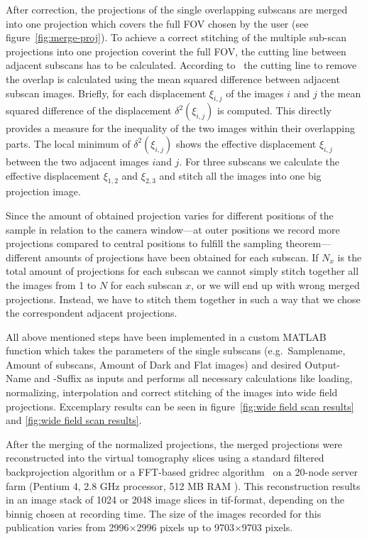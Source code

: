 After correction, the projections of the single overlapping subscans are merged into one projection which covers the full FOV chosen by the user (see figure~\ref{fig:merge-proj}). To achieve a correct stitching of the multiple sub-scan projections into one projection coverint the full FOV, the cutting line between adjacent subscans has to be calculated. According to~\citet{Hintermueller2009} the cutting line to remove the overlap is calculated using the mean squared difference between adjacent subscan images. Briefly, for each displacement $\xi_{i,j}$ of the images $i$ and $j$ the mean squared difference of the displacement $\delta^2(\xi_{i,j})$ is computed. This directly provides a measure for the inequality of the two images within their overlapping parts. The local minimum of $\delta^2(\xi_{i,j})$ shows the effective displacement $\xi_{i,j}$ between the two adjacent images $i$and $j$. For three subscans we calculate the effective displacement $\xi_{1,2}$ and $\xi_{2,3}$ and stitch all the images into one big projection image.

Since the amount of obtained projection varies for different positions of the sample in relation to the camera window---at outer positions we record more projections compared to central positions to fulfill the sampling theorem---different amounts of projections have been obtained for each subscan. If $N_x$ is the total amount of projections for each subscan we cannot simply stitch together all the images from 1 to $N$ for each subscan $x$, or we will end up with wrong merged projections. Instead, we have to stitch them together in such a way that we chose the correspondent adjacent projections. 

All above mentioned steps have been implemented in a custom MATLAB\textsuperscript{\textregistered} function which takes the parameters of the single subscans (e.g.\ Samplename, Amount of subscans, Amount of Dark and Flat images) and desired Output-Name and -Suffix as inputs and performs all necessary calculations like loading, normalizing, interpolation and correct stitching of the images into wide field projections. Excemplary results can be seen in figure~\ref{fig:wide field scan results} and \ref{fig:wide field scan results}.

After the merging of the normalized projections, the merged projections were reconstructed into the virtual tomography slices using a standard filtered backprojection algorithm or a FFT-based gridrec algorithm~\cite{Dowd1999} on a 20-node server farm (Pentium 4, 2.8 GHz processor, 512 MB RAM ). This reconstruction results in an image stack of 1024 or 2048 image slices in tif-format, depending on the binnig chosen at recording time. The size of the images recorded for this publication varies from 2996$\times$2996 pixels up to 9703$\times$9703 pixels.